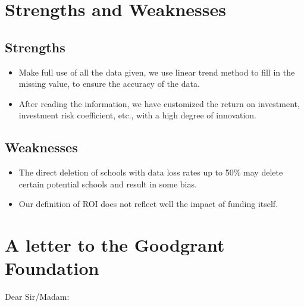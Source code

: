\documentclass{mcmthesis}
\begin{document}
\section{Strengths and Weaknesses}
\subsection{Strengths}
\begin{itemize} 
\item Make full use of all the data given, we use linear trend method to fill in the missing value, to ensure the accuracy of the data.

\item After reading the information, we have customized the return on investment, investment risk coefficient, etc., with a high degree of innovation.

\end{itemize}
\subsection{Weaknesses}
\begin{itemize}
	\item The direct deletion of schools with data loss rates up to 50\% may delete certain potential schools and result in some bias.
	\item Our definition of ROI does not reflect well the impact of funding itself.
\end{itemize}


\section{A letter to the Goodgrant Foundation}

Dear Sir/Madam:
\end{document}
